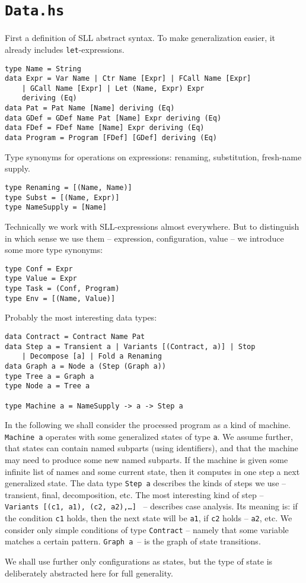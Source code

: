 \section{\texttt{Data.hs}}

First a definition of SLL abstract syntax. To make generalization easier, it
already includes \texttt{let}-expressions.
\begin{lstlisting}[name=data]
type Name = String
data Expr = Var Name | Ctr Name [Expr] | FCall Name [Expr] 
	| GCall Name [Expr] | Let (Name, Expr) Expr 
	deriving (Eq)
data Pat = Pat Name [Name] deriving (Eq)
data GDef = GDef Name Pat [Name] Expr deriving (Eq)
data FDef = FDef Name [Name] Expr deriving (Eq)
data Program = Program [FDef] [GDef] deriving (Eq)
\end{lstlisting}

Type synonyms for operations on expressions: renaming, substitution, fresh-name supply.
\begin{lstlisting}[name=data]
type Renaming = [(Name, Name)]
type Subst = [(Name, Expr)]
type NameSupply = [Name]
\end{lstlisting}

Technically we work with SLL-expressions almost everywhere. 
But to distinguish in which sense we use them --
expression, configuration, value --
we introduce some more type synonyms:
\begin{lstlisting}[name=data]
type Conf = Expr
type Value = Expr
type Task = (Conf, Program)
type Env = [(Name, Value)]
\end{lstlisting}

Probably the most interesting data types:
\begin{lstlisting}[name=data]
data Contract = Contract Name Pat
data Step a = Transient a | Variants [(Contract, a)] | Stop 
	| Decompose [a] | Fold a Renaming
data Graph a = Node a (Step (Graph a))
type Tree a = Graph a
type Node a = Tree a

type Machine a = NameSupply -> a -> Step a
\end{lstlisting}

In the following we shall consider the processed program as a kind of machine.
\texttt{Machine~a} operates with some generalized states of type \texttt{a}.
We assume further, that states can contain named subparts (using identifiers), and that
the machine may need to produce some new named subparts.
If the machine is given some infinite list of names and some current state,
then it computes in one step a next generalized state.
The data type \texttt{Step~a} describes the kinds of steps we use
-- transient, final, decomposition, etc. 
The most interesting kind of step -- \texttt{Variants~[(c1,~a1),~(c2,~a2),\ldots]}
~-- describes case analysis. 
Its meaning is: if the condition \texttt{c1} holds, then the next state will be \texttt{a1},
if \texttt{c2} holds -- \texttt{a2}, etc.
We consider only simple conditions of type \texttt{Contract} --
namely that some variable matches a certain pattern.
\texttt{Graph~a}~-- is the graph of state transitions.

We shall use further only configurations as states, but the type of state
is deliberately abstracted here for full generality.
